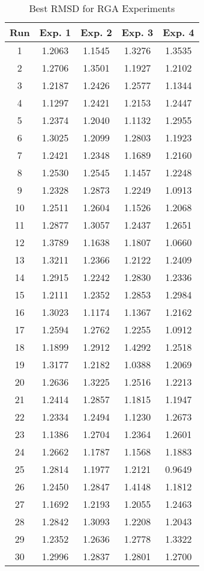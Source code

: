 \begin{table}
	\centering
	\begin{tabular}{ | c | c | c | c | c | }
		\hline
		Run & Exp. 1 & Exp. 2 & Exp. 3 & Exp. 4 \\ \hline
		1 & 1.2063 & 1.1545 & 1.3276 & 1.3535 \\ \hline
		2 & 1.2706 & 1.3501 & 1.1927 & 1.2102 \\ \hline
		3 & 1.2187 & 1.2426 & 1.2577 & 1.1344 \\ \hline
		4 & 1.1297 & 1.2421 & 1.2153 & 1.2447 \\ \hline
		5 & 1.2374 & 1.2040 & 1.1132 & 1.2955 \\ \hline
		6 & 1.3025 & 1.2099 & 1.2803 & 1.1923 \\ \hline
		7 & 1.2421 & 1.2348 & 1.1689 & 1.2160 \\ \hline
		8 & 1.2530 & 1.2545 & 1.1457 & 1.2248 \\ \hline
		9 & 1.2328 & 1.2873 & 1.2249 & 1.0913 \\ \hline
		10 & 1.2511 & 1.2604 & 1.1526 & 1.2068 \\ \hline
		11 & 1.2877 & 1.3057 & 1.2437 & 1.2651 \\ \hline
		12 & 1.3789 & 1.1638 & 1.1807 & 1.0660 \\ \hline
		13 & 1.3211 & 1.2366 & 1.2122 & 1.2409 \\ \hline
		14 & 1.2915 & 1.2242 & 1.2830 & 1.2336 \\ \hline
		15 & 1.2111 & 1.2352 & 1.2853 & 1.2984 \\ \hline
		16 & 1.3023 & 1.1174 & 1.1367 & 1.2162 \\ \hline
		17 & 1.2594 & 1.2762 & 1.2255 & 1.0912 \\ \hline
		18 & 1.1899 & 1.2912 & 1.4292 & 1.2518 \\ \hline
		19 & 1.3177 & 1.2182 & 1.0388 & 1.2069 \\ \hline
		20 & 1.2636 & 1.3225 & 1.2516 & 1.2213 \\ \hline
		21 & 1.2414 & 1.2857 & 1.1815 & 1.1947 \\ \hline
		22 & 1.2334 & 1.2494 & 1.1230 & 1.2673 \\ \hline
		23 & 1.1386 & 1.2704 & 1.2364 & 1.2601 \\ \hline
		24 & 1.2662 & 1.1787 & 1.1568 & 1.1883 \\ \hline
		25 & 1.2814 & 1.1977 & 1.2121 & 0.9649 \\ \hline
		26 & 1.2450 & 1.2847 & 1.4148 & 1.1812 \\ \hline
		27 & 1.1692 & 1.2193 & 1.2055 & 1.2463 \\ \hline
		28 & 1.2842 & 1.3093 & 1.2208 & 1.2043 \\ \hline
		29 & 1.2352 & 1.2636 & 1.2778 & 1.3322 \\ \hline
		30 & 1.2996 & 1.2837 & 1.2801 & 1.2700 \\ \hline
	\end{tabular}
	\caption{Best RMSD for RGA Experiments}
	\label{table:appendix-rga-1}
\end{table}

